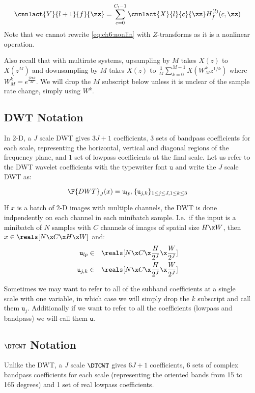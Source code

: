 \begin{equation}
  \cnnlact{Y}{l+1}{f}{\zz} = \sum_{c=0}^{C_l - 1} \cnnlact{X}{l}{c}{\zz}
  H_f^{(l)}(c, \zz)
\end{equation}
%
Note that we cannot rewrite \eqref{eq:ch6:nonlin} with $Z$-transforms as it is a nonlinear
operation.

Also recall that with multirate systems, upsampling by $M$ takes $X(z)$ to
$X(z^M)$ and downsampling by $M$ takes $X(z)$ to $\frac{1}{M}\sum_{k=0}^{M-1} X(W_M^k
z^{1/k})$ where $W_M^k = e^{\frac{j2\pi k}{M}}$. We will drop the $M$ subscript
below unless it is unclear of the sample rate change, simply using $W^k$.

\subsection{DWT Notation}
In 2-D, a $J$ scale DWT gives $3J+1$ coefficients, 3 sets of bandpass
coefficients for each scale, representing the horizontal, vertical and diagonal
regions of the frequency plane, and 1 set of lowpass coefficients at the final
scale. Let us refer to the DWT wavelet coefficients with the typewriter font
$\mathtt{u}$ and write the $J$ scale DWT as:

\begin{equation}
  \F{DWT}_J(x) = \mathtt{u}_{lp}, \{\mathtt{u}_{j,k} \}_{1\leq j\leq J, 1\leq k\leq 3}
  \label{eq:ch6:dwt_coeffs}
\end{equation}

If $x$ is a batch of 2-D images with multiple channels, the DWT is done
indpendently on each channel in each minibatch sample. I.e.\ if the input is a
minibatch of $N$ samples with $C$ channels of images of spatial size $H\x W$,
then $x \in \reals[N\x C\x H\x W]$ and:
%
\begin{eqnarray}
  \mathtt{u}_{lp} &\in & \reals[N\x C\x \frac{H}{2^{J}} \x \frac{W}{2^{J}}] \\
  \mathtt{u}_{j,k} &\in & \reals[N\x C\x \frac{H}{2^{J}}\x \frac{W}{2^{J}}]
\end{eqnarray}

Sometimes we may want to refer to all of the subband coefficients at a single scale
with one variable, in which case we will simply drop the $k$ subscript 
and call them $\mathtt{u}_{j}$. Additionally if we want to refer to all the
coefficients (lowpass and bandpass) we will call them $\mathtt{u}$.

\subsection{$\DTCWT$ Notation}
Unlike the DWT, a $J$ scale $\DTCWT$ gives $6J+1$ coefficients, 6 sets of complex
bandpass coefficients for each scale (representing the oriented bands from 15 to 165
degrees) and 1 set of real lowpass coefficients. 

